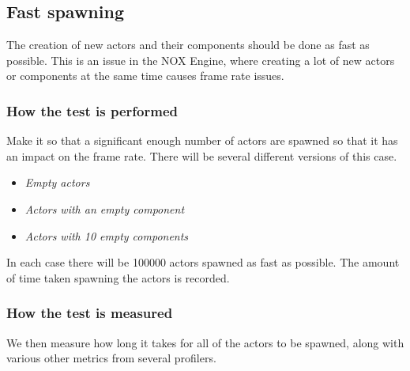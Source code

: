 \subsection{Fast spawning}
The creation of new actors and their components should be done as fast as possible.
This is an issue in the NOX Engine, where creating a lot of new actors or components at the same time causes frame rate issues.

\subsubsection*{How the test is performed}
Make it so that a significant enough number of actors are spawned so that it has an impact on the frame rate.
There will be several different versions of this case.

\begin{itemize}

    \item\noindent\textit{Empty actors}\\

    \item\noindent\textit{Actors with an empty component}\\

    \item\noindent\textit{Actors with 10 empty components}\\

\end{itemize}
In each case there will be 100000 actors spawned as fast as possible.
The amount of time taken spawning the actors is recorded.


\subsubsection*{How the test is measured}
We then measure how long it takes for all of the actors to be spawned, along with various other metrics from several profilers.
